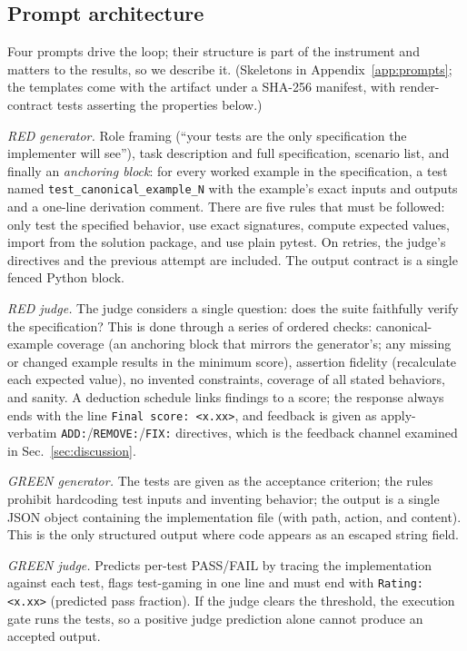 \documentclass{article}
\begin{document}
\subsection{Prompt architecture}
\label{sec:prompts}

Four prompts drive the loop; their structure is part of the instrument and matters to the
results, so we describe it. (Skeletons in Appendix~\ref{app:prompts}; the templates come with
the artifact under a SHA-256 manifest, with render-contract tests asserting the properties
below.)

\emph{RED generator.} Role framing (``your tests are the only specification the implementer
will see''), task description and full specification, scenario list, and finally an
\emph{anchoring block}: for every worked example in the specification, a test named
\texttt{test\_canonical\_example\_N} with the example's exact inputs and outputs and a one-line
derivation comment. There are five rules that must be followed: only test the specified behavior,
use exact signatures, compute expected values, import from the solution package, and use
plain pytest. On retries, the judge's directives and the previous attempt are included. The output
contract is a single fenced Python block.

\emph{RED judge.} The judge considers a single question: does the suite faithfully verify the
specification? This is done through a series of ordered checks: canonical-example coverage (an
anchoring block that mirrors the generator's; any missing or changed example results in the
minimum score), assertion fidelity (recalculate each expected value), no invented constraints,
coverage of all stated behaviors, and sanity. A deduction schedule links findings to a score; the
response always ends with the line \texttt{Final score: <x.xx>}, and feedback is given as
apply-verbatim \texttt{ADD:}/\texttt{REMOVE:}/\texttt{FIX:} directives, which is the feedback
channel examined in Sec.~\ref{sec:discussion}.

\emph{GREEN generator.} The tests are given as the acceptance criterion; the rules prohibit
hardcoding test inputs and inventing behavior; the output is a single JSON object containing the
implementation file (with path, action, and content). This is the only structured output where
code appears as an escaped string field.

\emph{GREEN judge.} Predicts per-test PASS/FAIL by tracing the implementation against each
test, flags test-gaming in one line and must end with \texttt{Rating: <x.xx>} (predicted pass
fraction). If the judge clears the threshold, the execution gate runs the tests, so a positive
judge prediction alone cannot produce an accepted output.
\end{document}
